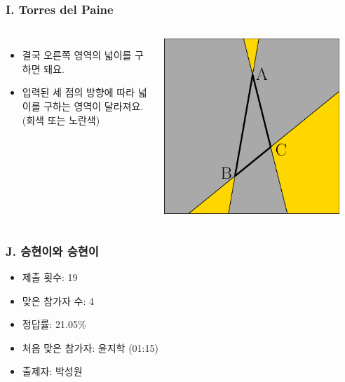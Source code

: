 \documentclass[xetex]{beamer}
\begin{document}
\begin{frame}
  \frametitle{I. Torres del Paine}
  \begin{columns}
      \begin{itemize}
        \item 결국 오른쪽 영역의 넓이를 구하면 돼요.
        \item 입력된 세 점의 방향에 따라 넓이를 구하는 영역이 달라져요. (회색 또는 노란색)
      \end{itemize}
      \includegraphics[width=0.9\textwidth]{torres-solution.eps}
  \end{columns}
\end{frame}

\begin{frame}
  \frametitle{J. 승현이와 승현이}
  \begin{itemize}
    \item 제출 횟수: 19
    \item 맞은 참가자 수: 4
    \item 정답률: 21.05\%
    \item 처음 맞은 참가자: 윤지학 (01:15)
    \item 출제자: 박성원
  \end{itemize}
\end{frame}
\end{document}
